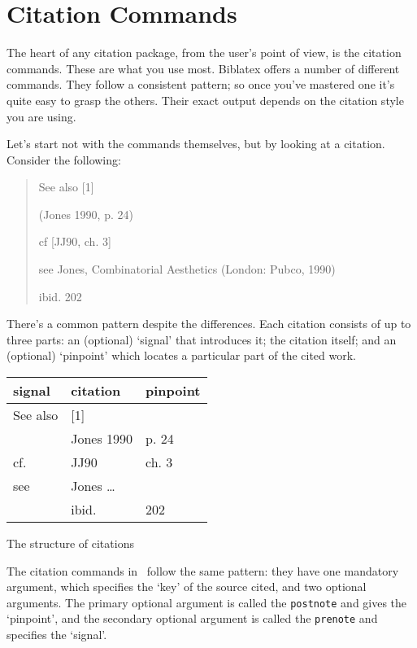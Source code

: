 \chapter{Citation Commands}\label{ch:citationcommands}


The heart of any citation package, from the user’s point of view, is
the citation commands. These are what you use most. Biblatex offers a
number of different commands. They follow a consistent pattern; so
once you’ve mastered one it’s quite easy to grasp the others. Their
exact output depends on the citation style you are using.

Let’s start not with the commands themselves, but by looking at a
citation. Consider the following:

\begin{quote}
See also [1]

(Jones 1990, p. 24)

cf [JJ90, ch. 3]

see Jones, Combinatorial Aesthetics (London: Pubco, 1990)

ibid. 202
\end{quote}

There’s a common pattern despite the differences. Each citation
consists of up to three parts: an (optional) `signal' that introduces
it; the citation itself; and an (optional) `pinpoint' which locates a
particular part of the cited work.

\begin{margintable}
\begin{tabular}{lll}
\toprule
\textsf{signal} & \textsf{citation} & \textsf{pinpoint} \\
\midrule 
See also &   [1] \\
         &   Jones 1990   & p. 24 \\
cf.      &   JJ90         & ch. 3 \\
see      &   Jones \ldots\    \\ 
         &   ibid.        &  202 \\
\bottomrule
\end{tabular}
\caption{The structure of citations}
\end{margintable}

The citation commands in \biblatex\ follow the same pattern: they have
one mandatory argument, which specifies the `key' of the source cited,
and two optional arguments. The primary optional argument is called
the \texttt{postnote} and gives the `pinpoint', and the secondary optional
argument is called the \texttt{prenote} and specifies the `signal'.

